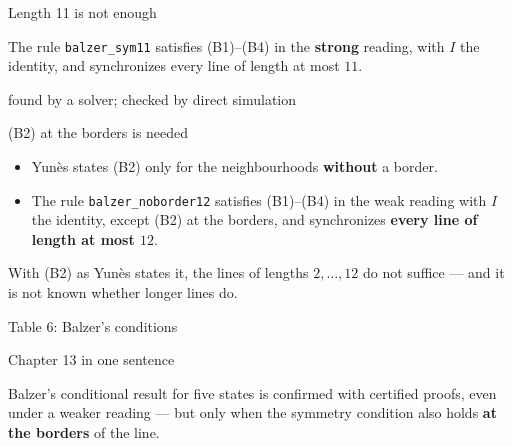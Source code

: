 \begin{frame}{Length 11 is not enough}
\vspace{4ex}
\begin{plainbox}\large
The rule \texttt{balzer\_sym11} satisfies (B1)--(B4) in the \textbf{strong} reading, with $I$ the identity, and synchronizes every line of length at most $11$.
\end{plainbox}
\small\centering found by a solver; checked by direct simulation
\end{frame}

\begin{frame}{(B2) at the borders is needed}
\begin{itemize}
\item Yun\`es states (B2) only for the neighbourhoods \textbf{without} a border.
\item The rule \texttt{balzer\_noborder12} satisfies (B1)--(B4) in the weak reading with $I$ the identity, except (B2) at the borders, and synchronizes \textbf{every line of length at most $12$}.
\end{itemize}
\vspace{2ex}
\begin{plainbox}
With (B2) as Yun\`es states it, the lines of lengths $2,\dots,12$ do not suffice --- and it is not known whether longer lines do.
\end{plainbox}
\end{frame}

\begin{frame}{Table 6: Balzer's conditions}
\centering\fig[0.70]{}
\end{frame}

\begin{frame}{Chapter 13 in one sentence}
\vspace{4ex}
\begin{plainbox}\large
Balzer's conditional result for five states is confirmed with certified proofs, even under a weaker reading --- but only when the symmetry condition also holds \textbf{at the borders} of the line.
\end{plainbox}
\end{frame}


